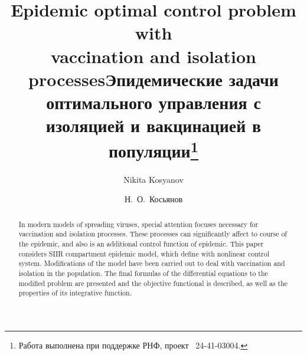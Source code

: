 \begin{englishtitle}
\title{Epidemic optimal control problem with\\ vaccination and isolation processes}
\author{Nikita Kosyanov}

\maketitle

\begin{abstract}
In modern models of spreading viruses, special attention focuses necessary for vaccination and isolation processes. These processes can significantly affect to course of the epidemic, and also is an additional control function of epidemic. This paper considers SIIR compartment epidemic model, which define with nonlinear control system. Modifications of the model have been carried out to deal with vaccination and isolation in the population. The final formulas of the differential equations to the modified problem are presented and the objective functional is described, as well as the properties of its integrative function.

\end{abstract}
\end{englishtitle}

\iffalse
\documentclass[12pt]{llncs}
\usepackage[T2A]{fontenc}
\usepackage[utf8]{inputenc}
\usepackage[english,russian]{babel}
\usepackage[russian]{nla}




\fi

\title{Эпидемические задачи оптимального управления с изоляцией и вакцинацией в популяции\thanks{Работа выполнена при поддержке РНФ, проект \textnumero~24-41-03004.}}
\author{Н.~О.~Косьянов
} %

\maketitle

